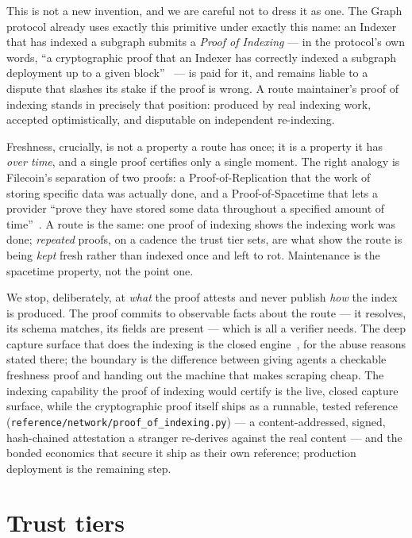 \documentclass[11pt]{article}
\begin{document}
This is not a new invention, and we are careful not to dress it as one. The Graph
protocol already uses exactly this primitive under exactly this name: an Indexer
that has indexed a subgraph submits a \emph{Proof of Indexing} --- in the protocol's
own words, ``a cryptographic proof that an Indexer has correctly indexed a subgraph
deployment up to a given block''~\cite{thegraph} --- is paid for it, and remains
liable to a dispute that slashes its stake if the proof is wrong. A route
maintainer's proof of indexing stands in precisely that position: produced by real
indexing work, accepted optimistically, and disputable on independent re-indexing.

Freshness, crucially, is not a property a route has once; it is a property it has
\emph{over time}, and a single proof certifies only a single moment. The right
analogy is Filecoin's separation of two proofs: a Proof-of-Replication that the work
of storing specific data was actually done, and a Proof-of-Spacetime that lets a
provider ``prove they have stored some data throughout a specified amount of
time''~\cite{filecoin2017}. A route is the same: one proof of indexing shows the
indexing work was done; \emph{repeated} proofs, on a cadence the trust tier sets,
are what show the route is being \emph{kept} fresh rather than indexed once and left
to rot. Maintenance is the spacetime property, not the point one.

We stop, deliberately, at \emph{what} the proof attests and never publish \emph{how}
the index is produced. The proof commits to observable facts about the route --- it
resolves, its schema matches, its fields are present --- which is all a verifier
needs. The deep capture surface that does the indexing is the closed
engine~\cite{ossnotice}, for the abuse reasons stated there; the boundary is the
difference between giving agents a checkable freshness proof and handing out the
machine that makes scraping cheap. The indexing capability the proof of indexing
would certify is the live, closed capture surface, while
the cryptographic proof itself ships as a runnable, tested reference
(\texttt{reference/network/proof\_of\_indexing.py}) --- a content-addressed, signed,
hash-chained attestation a stranger re-derives against the real content --- and the
bonded economics that secure it ship as their own reference; production deployment
is the remaining step.
\section{Trust tiers}
\end{document}
